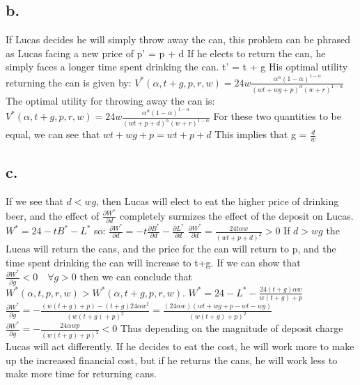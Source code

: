 \documentclass[10pt, letterpaper]{paper}
\begin{document}
\subsection*{b.}
If Lucas decides he will simply throw away the can, this problem can be phrased as Lucas facing a new price of p' = p + d
\newline
If he elects to return the can, he simply faces a longer time spent drinking the can. t' = t + g
\newline
His optimal utility returning the can is given by:
\newline
$V^*(\alpha, t+g, p, r, w ) = 24w \frac{ \alpha^\alpha (1-\alpha)^{1-\alpha}  }{ (wt+ wg + p)^\alpha ( w + r )^{1-\alpha} }$
\newline
The optimal utility for throwing away the can is:
$V^*(\alpha, t+g, p, r, w ) = 24w \frac{ \alpha^\alpha (1-\alpha)^{1-\alpha}  }{ (wt + p+ d)^\alpha ( w + r )^{1-\alpha} }$
\newline
For these two quantities to be equal, we can see that $wt + wg + p = wt + p + d$ This implies that g = $\frac{d}{w}$

\subsection*{c.}

If we see that $d < wg$, then Lucas will elect to eat the higher price of drinking beer, and the effect of $\frac{\partial W^* }{\partial d }$ completely surmizes the effect of the deposit on Lucas.
\newline
$W^* = 24 - tB^* - L^*$ so: $\frac{ \partial W^* }{\partial d } = -t \frac{ \partial B^* }{ \partial d } - \frac{ \partial L^* }{ \partial d }$
\newline
$\frac{ \partial W^* }{\partial d } = \frac{24 t \alpha w } { ( wt + p + d)^2 } > 0$
\newline \newline
If $d > wg$ the Lucas will return the cans, and the price for the can will return to p, and the time spent drinking the can will increase to t+g. If we can show that $\frac{ \partial W^* }{ \partial g } < 0 \quad \forall g > 0$ then we can conclude that $W^*(\alpha, t, p, r, w ) > W^*(\alpha, t + g, p, r, w )$.
\newline
$W^* = 24 - L^* - \frac{ 24 (t+g) \alpha w }{ w(t+g) + p}$
\newline
$ \frac{ \partial W^* }{ \partial g } = -\frac{ ( w (t+g) + p ) - (t+g)24 \alpha w^2 }{ ( w (t+g) + p )^2 } = \frac{ ( 24 \alpha w )( wt + wg + p - wt -wg )}{ ( w (t+g) + p )^2 } $ 
\newline
$ \frac{ \partial W^* }{ \partial g } = -\frac{ 24 \alpha w p }{ ( w (t+g) + p )^2 } < 0$
\newline
Thus depending on the magnitude of deposit charge Lucas will act differently. If he decides to eat the cost, he will work more to make up the increased financial cost, but if he returns the cans, he will work less to make more time for returning cans.
\end{document}
